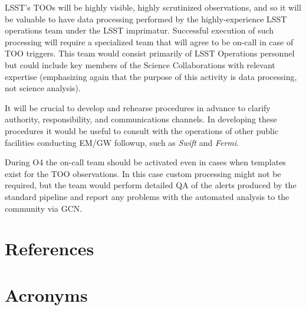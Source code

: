 \documentclass[DM,authoryear,toc]{lsstdoc}
\begin{document}
LSST's TOOs will be highly visible, highly scrutinized observations, and so it will be valuable to have data processing performed by the highly-experience LSST operations team under the LSST imprimatur.
Successful execution of such processing will require a specialized team that will agree to be on-call in case of TOO triggers.
This team would consist primarily of LSST Operations personnel but could include key members of the Science Collaborations with relevant expertise (emphasizing again that the purpose of this activity is data processing, not science analysis).

It will be crucial to develop and rehearse procedures in advance to clarify authority, responsibility, and communications channels. 
In developing these procedures it would be useful to consult with the operations of other public facilities conducting EM/GW followup, such as \textit{Swift} and \textit{Fermi}.

During O4 the on-call team should be activated even in cases when templates exist for the TOO observations.
In this case custom processing might not be required, but the team would perform detailed QA of the alerts produced by the standard pipeline and report any problems with the automated analysis to the community via GCN.


\appendix
\section{References} \label{sec:bib}
\renewcommand{\refname}{} %


\section{Acronyms} \label{sec:acronyms}

\end{document}
